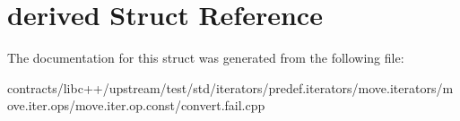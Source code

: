 \hypertarget{structderived}{}\section{derived Struct Reference}
\label{structderived}


The documentation for this struct was generated from the following file\+:\begin{DoxyCompactItemize}
\item 
contracts/libc++/upstream/test/std/iterators/predef.\+iterators/move.\+iterators/move.\+iter.\+ops/move.\+iter.\+op.\+const/convert.\+fail.\+cpp\end{DoxyCompactItemize}
